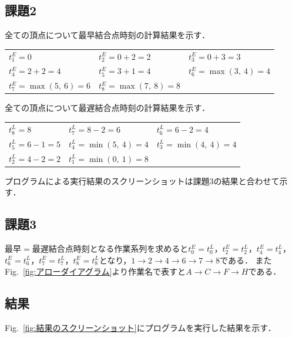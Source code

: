 \documentclass[a4paper,10pt]{jsarticle}
\begin{document}
\subsection{課題2}
全ての頂点について最早結合点時刻の計算結果を示す．
\begin{table}[!h]
 \begin{center}
  \begin{tabular}{lll}
    $t_1^E = 0$ & $t_2^E = 0+2 = 2$ & $t_3^E = 0+3 = 3$ \\
    $t_4^E = 2+2 = 4$ & $t_5^E = 3+1 = 4$ & $t_6^E = \max(3,\ 4) = 4$ \\
    $t_7^E = \max(5,\ 6) = 6$ & $t_8^E = \max(7,\ 8) = 8$ &\\
  \end{tabular}
 \end{center}
\end{table}

全ての頂点について最遅結合点時刻の計算結果を示す．
\begin{table}[!h]
 \begin{center}
  \begin{tabular}{lll}
    $t_8^L = 8$ & $t_7^L = 8-2 = 6$ & $t_6^L = 6-2 = 4$ \\
    $t_5^L = 6-1 = 5$ & $t_4^L = \min(5,\ 4) = 4$ & $t_3^L = \min(4,\ 4) = 4$ \\
    $t_2^L = 4-2 = 2$ & $t_1^L = \min(0,\ 1) = 8$ &\\
  \end{tabular}
 \end{center}
\end{table}

プログラムによる実行結果のスクリーンショットは課題3の結果と合わせて示す．

\subsection{課題3}
最早$=$最遅結合点時刻となる作業系列を求めると$t_0^E = t_0^L$，$t_2^E = t_2^L$，$t_4^E = t_4^L$，$t_6^E = t_6^L$，$t_7^E = t_7^L$，$t_8^E = t_8^L$となり，$1\rightarrow 2\rightarrow 4\rightarrow 6 \rightarrow 7\rightarrow 8$である．
またFig.~\ref{fig:アローダイアグラム}より作業名で表すと$A\rightarrow C\rightarrow F\rightarrow H$である．

\subsection{結果}
Fig.~\ref{fig:結果のスクリーンショット}にプログラムを実行した結果を示す．
\end{document}
